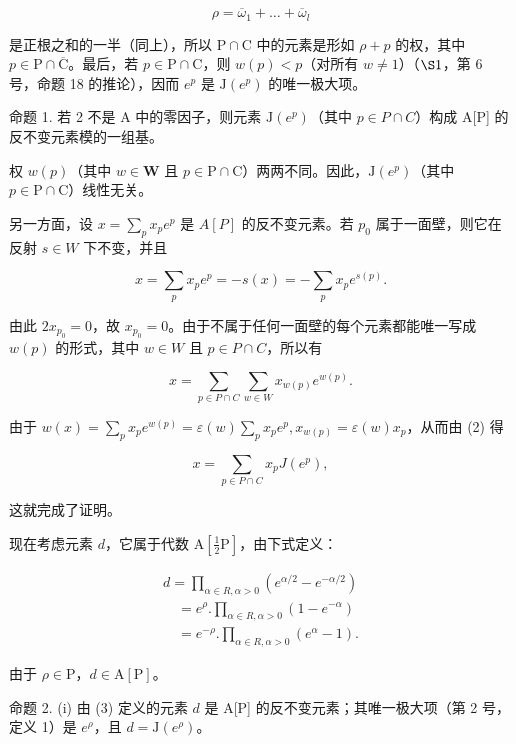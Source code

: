 \[
\rho = \overline {{\omega}} _ {1} + \dots + \overline {{\omega}} _ {l}
\]

是正根之和的一半（同上），所以 \(\mathrm{P} \cap \mathrm{C}\) 中的元素是形如 \(\rho + p\) 的权，其中 \(p \in \mathrm{P} \cap \overline{\mathrm{C}}\)。最后，若 \(p \in \mathrm{P} \cap \mathrm{C}\)，则 \(w(p) < p\)（对所有 \(w \neq 1\)）（\(\S 1\)，第 6 号，命题 18 的推论），因而 \(e^p\) 是 \(\mathrm{J}(e^p)\) 的唯一极大项。

命题 1. 若 2 不是 A 中的零因子，则元素 \(\mathrm{J}(e^{p})\)（其中 \(p \in P \cap C\)）构成 A{[}P{]} 的反不变元素模的一组基。

权 \(w(p)\)（其中 \(w \in \mathbf{W}\) 且 \(p \in \mathrm{P} \cap \mathrm{C}\)）两两不同。因此，\(\mathrm{J}(e^p)\)（其中 \(p \in \mathrm{P} \cap \mathrm{C}\)）线性无关。

另一方面，设 \(x = \sum_{p} x_{p} e^{p}\) 是 \(A[P]\) 的反不变元素。若 \(p_{0}\) 属于一面壁，则它在反射 \(s \in W\) 下不变，并且

\[
x = \sum_ {p} x _ {p} e ^ {p} = - s (x) = - \sum_ {p} x _ {p} e ^ {s (p)}.
\]

由此 \(2x_{p_{0}} = 0\)，故 \(x_{p_{0}} = 0\)。由于不属于任何一面壁的每个元素都能唯一写成 \(w(p)\) 的形式，其中 \(w \in W\) 且 \(p \in P \cap C\)，所以有

\[
x = \sum_ {p \in P \cap C} \sum_ {w \in W} x _ {w (p)} e ^ {w (p)}.\tag{2}
\]

由于 \(w(x) = \sum_{p} x_{p} e^{w(p)} = \varepsilon(w) \sum_{p} x_{p} e^{p}, x_{w(p)} = \varepsilon(w) x_{p}\)，从而由 (2) 得

\[
x = \sum_ {p \in P \cap C} x _ {p} J (e ^ {p}),
\]

这就完成了证明。

现在考虑元素 \(d\)，它属于代数 \(\mathrm{A}[\frac{1}{2}\mathrm{P}]\)，由下式定义：

\[
\begin{array}{l} d = \prod_ {\alpha \in R, \alpha > 0} (e ^ {\alpha / 2} - e ^ {- \alpha / 2}) \\ \quad = e ^ {\rho}. \prod_ {\alpha \in R, \alpha > 0} (1 - e ^ {- \alpha}) \\ \quad = e ^ {- \rho}. \prod_ {\alpha \in R, \alpha > 0} (e ^ {\alpha} - 1). \end{array}\tag{3}
\]

由于 \(\rho \in \mathrm{P}\)，\(d \in \mathrm{A}[\mathrm{P}]\)。

命题 2. (i) 由 (3) 定义的元素 \(d\) 是 A{[}P{]} 的反不变元素；其唯一极大项（第 2 号，定义 1）是 \(e^{\rho}\)，且 \(d = \mathrm{J}(e^{\rho})\)。

